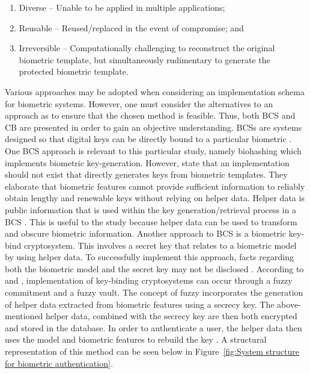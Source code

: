\begin{enumerate}[label=\roman*.]
	\item Diverse – Unable to be applied in multiple applications;
	\item Reusable – Reused/replaced in the event of compromise; and
	\item Irreversible – Computationally challenging to reconstruct the original biometric template, but simultaneously rudimentary to generate the protected biometric template.
\end{enumerate}

Various approaches may be adopted when considering an implementation schema for biometric systems. However, one must consider the alternatives to an approach as to ensure that the chosen method is feasible. Thus, both BCS and CB are presented in order to gain an objective understanding. 
BCSs are systems designed so that digital keys can be directly bound to a particular biometric \citep{Rathgeb2011}. One BCS approach is relevant to this particular study, namely biohashing which implements biometric key-generation. However, \cite{Rathgeb2011} state that an implementation should not exist that directly generates keys from biometric templates. They elaborate that biometric features cannot provide sufficient information to reliably obtain lengthy and renewable keys without relying on helper data. Helper data is public information that is used within the key generation/retrieval process in a BCS \citep{Rathgeb2011}.  This is useful to the study because helper data can be used to transform and obscure biometric information. Another approach to BCS is a biometric key-bind cryptosystem. This involves a secret key that relates to a biometric model by using helper data. To successfully implement this approach, facts regarding both the biometric model and the secret key may not be disclosed \citep{Eng2016}. According to \cite{Paul2014} and \cite{Rathgeb2011}, implementation of key-binding cryptosystems can occur through a fuzzy commitment and a fuzzy vault. The concept of fuzzy incorporates the generation of helper data extracted from biometric features using a secrecy key. The above-mentioned helper data, combined with the secrecy key are then both encrypted and stored in the database. In order to authenticate a user, the helper data then uses the model and biometric features to rebuild the key \citep{Eng2016}. A structural representation of this method can be seen below in Figure~\ref{fig:System structure for biometric authentication}.


